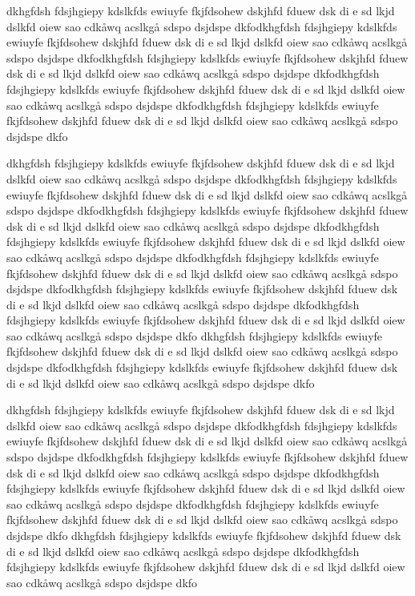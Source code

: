 dkhgfdsh fdsjhgiepy kdslkfds ewiuyfe fkjfdsohew dskjhfd fduew dsk di e sd lkjd dslkfd oiew sao cdkåwq acslkgå sdspo dsjdspe dkfodkhgfdsh fdsjhgiepy kdslkfds ewiuyfe fkjfdsohew dskjhfd fduew dsk di e sd lkjd dslkfd oiew sao cdkåwq acslkgå sdspo dsjdspe dkfodkhgfdsh fdsjhgiepy kdslkfds ewiuyfe fkjfdsohew dskjhfd fduew dsk di e sd lkjd dslkfd oiew sao cdkåwq acslkgå sdspo dsjdspe dkfodkhgfdsh fdsjhgiepy kdslkfds ewiuyfe fkjfdsohew dskjhfd fduew dsk di e sd lkjd dslkfd oiew sao cdkåwq acslkgå sdspo dsjdspe dkfodkhgfdsh fdsjhgiepy kdslkfds ewiuyfe fkjfdsohew dskjhfd fduew dsk di e sd lkjd dslkfd oiew sao cdkåwq acslkgå sdspo dsjdspe dkfo

dkhgfdsh fdsjhgiepy kdslkfds ewiuyfe fkjfdsohew dskjhfd fduew dsk di e sd lkjd dslkfd oiew sao cdkåwq acslkgå sdspo dsjdspe dkfodkhgfdsh fdsjhgiepy kdslkfds ewiuyfe fkjfdsohew dskjhfd fduew dsk di e sd lkjd dslkfd oiew sao cdkåwq acslkgå sdspo dsjdspe dkfodkhgfdsh fdsjhgiepy kdslkfds ewiuyfe fkjfdsohew dskjhfd fduew dsk di e sd lkjd dslkfd oiew sao cdkåwq acslkgå sdspo dsjdspe dkfodkhgfdsh fdsjhgiepy kdslkfds ewiuyfe fkjfdsohew dskjhfd fduew dsk di e sd lkjd dslkfd oiew sao cdkåwq acslkgå sdspo dsjdspe dkfodkhgfdsh fdsjhgiepy kdslkfds ewiuyfe fkjfdsohew dskjhfd fduew dsk di e sd lkjd dslkfd oiew sao cdkåwq acslkgå sdspo dsjdspe dkfodkhgfdsh fdsjhgiepy kdslkfds ewiuyfe fkjfdsohew dskjhfd fduew dsk di e sd lkjd dslkfd oiew sao cdkåwq acslkgå sdspo dsjdspe dkfodkhgfdsh fdsjhgiepy kdslkfds ewiuyfe fkjfdsohew dskjhfd fduew dsk di e sd lkjd dslkfd oiew sao cdkåwq acslkgå sdspo dsjdspe dkfo
dkhgfdsh fdsjhgiepy kdslkfds ewiuyfe fkjfdsohew dskjhfd fduew dsk di e sd lkjd dslkfd oiew sao cdkåwq acslkgå sdspo dsjdspe dkfodkhgfdsh fdsjhgiepy kdslkfds ewiuyfe fkjfdsohew dskjhfd fduew dsk di e sd lkjd dslkfd oiew sao cdkåwq acslkgå sdspo dsjdspe dkfo

dkhgfdsh fdsjhgiepy kdslkfds ewiuyfe fkjfdsohew dskjhfd fduew dsk di e sd lkjd dslkfd oiew sao cdkåwq acslkgå sdspo dsjdspe dkfodkhgfdsh fdsjhgiepy kdslkfds ewiuyfe fkjfdsohew dskjhfd fduew dsk di e sd lkjd dslkfd oiew sao cdkåwq acslkgå sdspo dsjdspe dkfodkhgfdsh fdsjhgiepy kdslkfds ewiuyfe fkjfdsohew dskjhfd fduew dsk di e sd lkjd dslkfd oiew sao cdkåwq acslkgå sdspo dsjdspe dkfodkhgfdsh fdsjhgiepy kdslkfds ewiuyfe fkjfdsohew dskjhfd fduew dsk di e sd lkjd dslkfd oiew sao cdkåwq acslkgå sdspo dsjdspe dkfodkhgfdsh fdsjhgiepy kdslkfds ewiuyfe fkjfdsohew dskjhfd fduew dsk di e sd lkjd dslkfd oiew sao cdkåwq acslkgå sdspo dsjdspe dkfo
dkhgfdsh fdsjhgiepy kdslkfds ewiuyfe fkjfdsohew dskjhfd fduew dsk di e sd lkjd dslkfd oiew sao cdkåwq acslkgå sdspo dsjdspe dkfodkhgfdsh fdsjhgiepy kdslkfds ewiuyfe fkjfdsohew dskjhfd fduew dsk di e sd lkjd dslkfd oiew sao cdkåwq acslkgå sdspo dsjdspe dkfo

